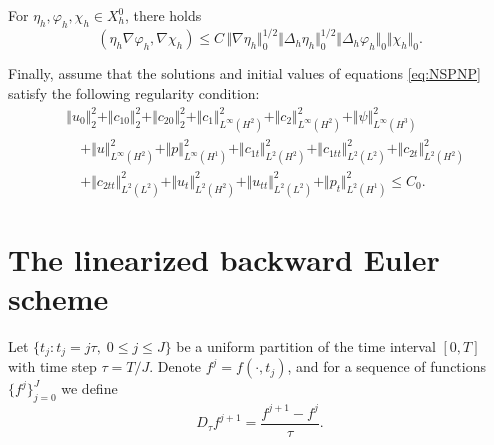 \begin{lemma}
  \label{lem:4}
  For $\eta_{h},\varphi_{h},\chi_{h}\in X^{0}_{h}$, there holds
  \begin{equation}
    (\eta_{h}\nabla\varphi_{h},\nabla\chi_{h})
    \le C\,\Vert\nabla\eta_{h}\Vert_{0}^{1/2}
           \Vert\Delta_{h}\eta_{h}\Vert_{0}^{1/2}
           \Vert\Delta_{h}\varphi_{h}\Vert_{0}
           \Vert\chi_{h}\Vert_{0}.
    \label{eq:lem4}
  \end{equation}
\end{lemma}

Finally, assume that the solutions and initial values of equations
\eqref{eq:NSPNP} satisfy the following regularity condition:
\begin{equation}
  \begin{aligned}
    &\Vert u_{0}\Vert_{2}^{2}
     + \Vert c_{10}\Vert_{2}^{2}
     + \Vert c_{20}\Vert_{2}^{2}
     + \Vert c_{1}\Vert_{L^{\infty}(H^{2})}^{2}
     + \Vert c_{2}\Vert_{L^{\infty}(H^{2})}^{2}
     + \Vert\psi\Vert_{L^{\infty}(H^{3})}^{2}\\
    &\quad
     + \Vert u\Vert_{L^{\infty}(H^{2})}^{2}
     + \Vert p\Vert_{L^{\infty}(H^{1})}^{2}
     + \Vert c_{1t}\Vert_{L^{2}(H^{2})}^{2}
     + \Vert c_{1tt}\Vert_{L^{2}(L^{2})}^{2}
     + \Vert c_{2t}\Vert_{L^{2}(H^{2})}^{2}\\
    &\quad
     + \Vert c_{2tt}\Vert_{L^{2}(L^{2})}^{2}
     + \Vert u_{t}\Vert_{L^{2}(H^{2})}^{2}
     + \Vert u_{tt}\Vert_{L^{2}(L^{2})}^{2}
     + \Vert p_{t}\Vert_{L^{2}(H^{1})}^{2}
    \le C_{0}.
  \end{aligned}
  \label{eq:regularity}
\end{equation}

\section{The linearized backward Euler scheme}
\label{sec:scheme}

Let $\{t_{j}: t_{j}=j\tau,\;0\le j\le J\}$ be a uniform partition of the
time interval $[0,T]$ with time step $\tau=T/J$. Denote
$f^{j}=f(\cdot,t_{j})$, and for a sequence of functions $\{f^{j}\}_{j=0}^{J}$
we define
\begin{equation}
  D_{\tau}f^{j+1} = \frac{f^{j+1}-f^{j}}{\tau}.
  \label{eq:Dtau}
\end{equation}

